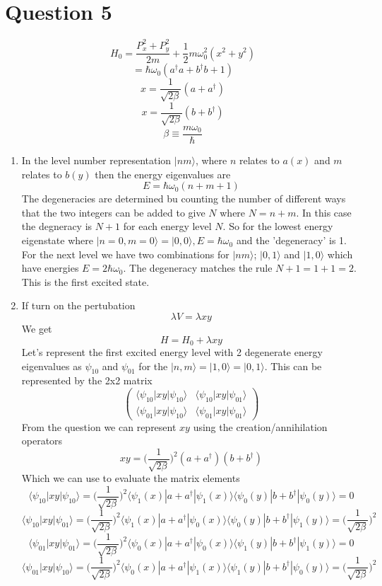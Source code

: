 \documentclass[12pt]{article}
\newcommand{\ket}[1]{\vert{#1}\rangle}
\begin{document}
\section*{Question 5}
$$H_0 = \frac{P_x^2 + P_y^2}{2m} + \frac{1}{2} m \omega_0^2 (x^2 + y^2) $$
$$ = \hbar \omega_0 (a^{\dagger} a + b^{\dagger} b + 1) $$
$$ x= \frac{1}{\sqrt{2 \beta} } (a + a^{\dagger}) $$
$$ x= \frac{1}{\sqrt{2 \beta} } (b + b^{\dagger}) $$
$$ \beta \equiv \frac{m \omega_0}{\hbar} $$
\begin{enumerate}
    \item In the level number representation $\ket{nm}$, where $n$ relates to $a(x)$ and $m$ relates to $b (y)$ then the energy eigenvalues are 
    $$ E = \hbar \omega_0 (n+m +1) $$
    The degeneracies are determined bu counting the number of different ways that the two integers can be added to give $N$ where $N = n +m$. In this case the degneracy is $N+1$ for each energy level $N$. 
    So for the lowest energy eigenstate where $\ket{n=0, m=0} = \ket{0,0}, E=\hbar \omega_0$ and the 'degeneracy' is 1. 
    For the next level we have two combinations for $\ket{nm}$; $\ket{0,1}$ and $\ket{1,0}$ which have energies $E= 2 \hbar \omega_0$. The degeneracy matches the rule $N+1 = 1 +1 = 2$. This is the first excited state.
    
    \item If turn on the pertubation 
    $$ \lambda V = \lambda xy$$ 
    We get 
    $$ H = H_0 + \lambda xy $$ 
    Let's represent the first excited energy level with 2 degenerate energy eigenvalues as $\psi_{10}$ and $\psi_{01}$ for the $\ket{n,m} = \ket{1,0} = \ket{0,1} $. 
    This can be represented by the 2x2 matrix 
    $$ \begin{pmatrix}
        \langle \psi_{10} | xy | \psi_{10} \rangle & \langle \psi_{10} | xy | \psi_{01} \rangle 
        \\
        \langle \psi_{01} | xy| \psi_{10} \rangle & \langle \psi_{01} | xy | \psi_{01} \rangle 
    \end{pmatrix} $$
    From the question we can represent $xy$ using the creation/annihilation operators 
    $$ xy = \Big( \frac{1}{\sqrt{2 \beta} } \Big)^2 (a + a^{\dagger} ) (b + b^{\dagger} ) $$
    Which we can use to evaluate the matrix elements 
    $$  \langle \psi_{10} | xy | \psi_{10} \rangle =  \Big( \frac{1}{\sqrt{2 \beta} } \Big)^2 \langle \psi_{1} (x) | a+a^{\dagger} | \psi_{1} (x) \rangle \langle \psi_{0} (y) | b+b^{\dagger} | \psi_{0} (y) \rangle = 0 $$
    $$  \langle \psi_{10} | xy | \psi_{01} \rangle =  \Big( \frac{1}{\sqrt{2 \beta} } \Big)^2 \langle \psi_{1} (x) | a+a^{\dagger} | \psi_{0} (x) \rangle \langle \psi_{0} (y) | b+b^{\dagger} | \psi_{1} (y) \rangle = \Big( \frac{1}{\sqrt{2 \beta} } \Big)^2 $$
    $$  \langle \psi_{01} | xy | \psi_{01} \rangle =  \Big( \frac{1}{\sqrt{2 \beta} } \Big)^2 \langle \psi_{0} (x) | a+a^{\dagger} | \psi_{0} (x) \rangle \langle \psi_{1} (y) | b+b^{\dagger} | \psi_{1} (y) \rangle = 0 $$
    $$  \langle \psi_{01} | xy | \psi_{10} \rangle =  \Big( \frac{1}{\sqrt{2 \beta} } \Big)^2 \langle \psi_{0} (x) | a+a^{\dagger} | \psi_{1} (x) \rangle \langle \psi_{1} (y) | b+b^{\dagger} | \psi_{0} (y) \rangle = \Big( \frac{1}{\sqrt{2 \beta} } \Big)^2 $$


\end{enumerate}
\end{document}
